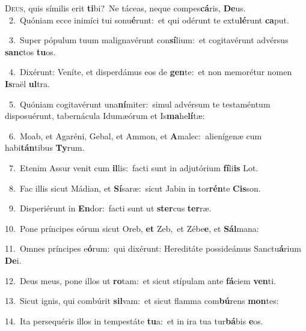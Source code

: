 \lettrine{\initial\textcolor{\initialcolor}{D}}{eus,} quis símilis erit \textbf{ti}\-bi?~\star Ne táceas, neque compes\-\textbf{cá}\-ris, \textbf{De}\-us.\\
{\numbfont\textcolor{\numbcolor}{~2.}}~Quóniam ecce inimíci tui sonu\-\textbf{é}\-runt:~\star et qui odérunt te extu\-\textbf{lé}\-runt \textbf{ca}\-put.\par
{\numbfont\textcolor{\numbcolor}{~3.}}~Super pópulum tuum malignavérunt con\-\textbf{sí}\-lium:~\star et cogitavérunt advérsus \textbf{sanc}\-tos \textbf{tu}\-os.\par
{\numbfont\textcolor{\numbcolor}{~4.}}~Dixérunt: Veníte, et disperdámus eos de \textbf{gen}\-te:~\star et non memorétur nomen \textbf{Is}\-raël \textbf{ul}\-tra.\par
{\numbfont\textcolor{\numbcolor}{~5.}}~Quóniam cogitavérunt una\-\textbf{ní}\-miter:~\star simul advérsum te testaméntum disposuérunt, tabernácula Idumæórum et Is\-\textbf{ma}\-he\-\textbf{lí}\-tæ:\par
{\numbfont\textcolor{\numbcolor}{~6.}}~Moab, et Agaréni, Gebal, et Ammon, et \textbf{A}\-malec:~\star alienígenæ cum habi\-\textbf{tán}\-tibus \textbf{Ty}\-rum.\par
{\numbfont\textcolor{\numbcolor}{~7.}}~Etenim Assur venit cum \textbf{il}\-lis:~\star facti sunt in adjutórium \textbf{fí}\-li\textbf{is} Lot.\par
{\numbfont\textcolor{\numbcolor}{~8.}}~Fac illis sicut Mádian, et \textbf{Sí}\-saræ:~\star sicut Jabin in tor\-\textbf{rén}\-te \textbf{Cis}\-son.\par
{\numbfont\textcolor{\numbcolor}{~9.}}~Disperiérunt in \textbf{En}\-dor:~\star facti sunt ut \textbf{ster}\-cus \textbf{ter}\-ræ.\par
{\numbfont\textcolor{\numbcolor}{10.}}~Pone príncipes eórum sicut Oreb, \textbf{et} Zeb,~\star et Zébe\-\textbf{e}\-, et \textbf{Sál}\-mana:\par
{\numbfont\textcolor{\numbcolor}{11.}}~Omnes príncipes e\-\textbf{ó}\-rum:~\star qui dixérunt: Hereditáte possideámus Sanctu\-\textbf{á}\-rium \textbf{De}\-i.\par
{\numbfont\textcolor{\numbcolor}{12.}}~Deus meus, pone illos ut \textbf{ro}\-tam:~\star et sicut stípulam ante \textbf{fá}\-ciem \textbf{ven}\-ti.\par
{\numbfont\textcolor{\numbcolor}{13.}}~Sicut ignis, qui combúrit \textbf{sil}\-vam:~\star et sicut flamma com\-\textbf{bú}\-rens \textbf{mon}\-tes:\par
{\numbfont\textcolor{\numbcolor}{14.}}~Ita persequéris illos in tempestáte \textbf{tu}\-a:~\star et in ira tua tur\-\textbf{bá}\-bis \textbf{e}\-os.\par
